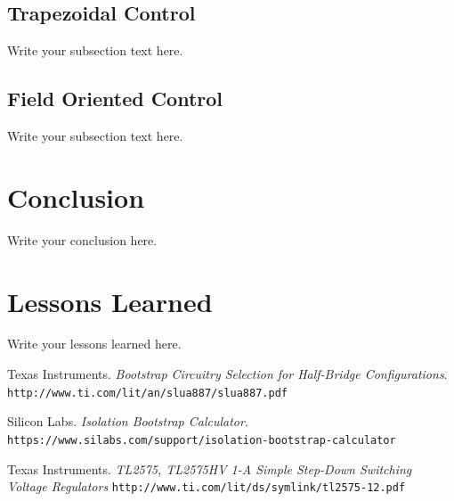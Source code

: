 \documentclass{article}
\begin{document}
		\subsection{Trapezoidal Control}
		Write your subsection text here.
		
		\subsection{Field Oriented Control}
		Write your subsection text here.
	
	\section{Conclusion}
	Write your conclusion here.
	
	\section{Lessons Learned}
	Write your lessons learned here.
	
	
	
	
	\begin{thebibliography}{9}
		Texas Instruments.
		\textit{Bootstrap Circuitry Selection for Half-Bridge Configurations}.
		\\\texttt{http://www.ti.com/lit/an/slua887/slua887.pdf}
		
		Silicon Labs. 
		\textit{Isolation Bootstrap Calculator}. 
		\\\texttt{https://www.silabs.com/support/isolation-bootstrap-calculator}
		
		Texas Instruments.
		\textit{TL2575, TL2575HV 1-A Simple Step-Down Switching Voltage Regulators}
		\texttt{http://www.ti.com/lit/ds/symlink/tl2575-12.pdf}
		
		
		
	\end{thebibliography}
	
	
	
\end{document}
